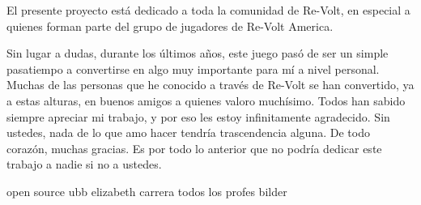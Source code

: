 El presente proyecto está dedicado a toda la comunidad de Re-Volt, en especial a quienes forman parte del grupo de jugadores de Re-Volt America.

Sin lugar a dudas, durante los últimos años, este juego pasó de ser un simple pasatiempo a convertirse en algo muy importante para mí a nivel personal. Muchas de las personas que he conocido a través de Re-Volt se han convertido, ya a estas alturas, en buenos amigos a quienes valoro muchísimo. Todos han sabido siempre apreciar mi trabajo, y por eso les estoy infinitamente agradecido. Sin ustedes, nada de lo que amo hacer tendría trascendencia alguna. De todo corazón, muchas gracias. Es por todo lo anterior que no podría dedicar este trabajo a nadie si no a ustedes.

open source ubb
elizabeth
carrera todos los profes
bilder